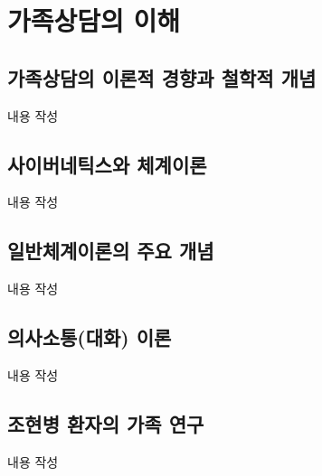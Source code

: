 \section{가족상담의 이해}

\subsection{가족상담의 이론적 경향과 철학적 개념}
내용 작성

\subsection{사이버네틱스와 체계이론}
내용 작성

\subsection{일반체계이론의 주요 개념}
내용 작성

\subsection{의사소통(대화) 이론}
내용 작성

\subsection{조현병 환자의 가족 연구}
내용 작성
